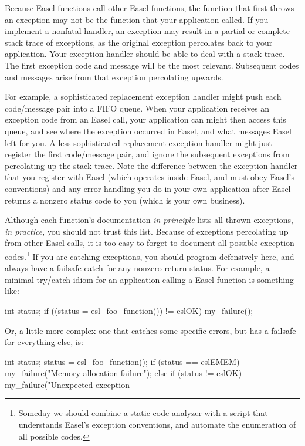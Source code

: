 Because Easel functions call other Easel functions, the function that
first throws an exception may not be the function that your
application called.  If you implement a nonfatal handler, an exception
may result in a partial or complete stack trace of exceptions, as the
original exception percolates back to your application. Your exception
handler should be able to deal with a stack trace. The first exception
code and message will be the most relevant. Subsequent codes and
messages arise from that exception percolating upwards. 

For example, a sophisticated replacement exception handler might push
each code/message pair into a FIFO queue. When your application
receives an exception code from an Easel call, your application can
might then access this queue, and see where the exception occurred in
Easel, and what messages Easel left for you. A less sophisticated
replacement exception handler might just register the first
code/message pair, and ignore the subsequent exceptions from
percolating up the stack trace. Note the difference between the
exception handler that you register with Easel (which operates inside
Easel, and must obey Easel's conventions) and any error handling you
do in your own application after Easel returns a nonzero status code
to you (which is your own business).

Although each function's documentation \emph{in principle} lists all
thrown exceptions, \emph{in practice}, you should not trust this
list. Because of exceptions percolating up from other Easel calls, it
is too easy to forget to document all possible exception
codes.\footnote{Someday we should combine a static code analyzer with
a script that understands Easel's exception conventions, and automate
the enumeration of all possible codes.} If you are catching
exceptions, you should program defensively here, and always have a
failsafe catch for any nonzero return status. For example, a minimal
try/catch idiom for an application calling a Easel function is
something like:

\begin{cchunk}
     int status;
     if ((status = esl_foo_function()) != eslOK)  my_failure();
\end{cchunk}

Or, a little more complex one that catches some specific errors, but
has a failsafe for everything else, is:

\begin{cchunk}
     int status;
     status = esl_foo_function();
     if      (status == eslEMEM) my_failure("Memory allocation failure");
     else if (status != eslOK)   my_failure("Unexpected exception %
\end{cchunk}


